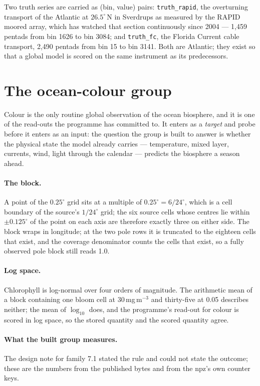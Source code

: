 \documentclass[10pt]{article}
\newcommand{\code}[1]{\texttt{#1}}
\begin{document}
Two truth series are carried as (bin, value) pairs: \code{truth\_rapid}, the
overturning transport of the Atlantic at $26.5^\circ$\,N in Sverdrups as
measured by the RAPID moored array, which has watched that section
continuously since 2004 --- 1,459 pentads from bin 1626 to bin 3084; and \code{truth\_fc}, the Florida
Current cable transport, 2,490 pentads from bin 15 to bin 3141. Both are
Atlantic; they exist so that a global model is scored on the same instrument
as its predecessors.

\section{The ocean-colour group}

Colour is the only routine global observation of the ocean biosphere, and it
is one of the read-outs the programme has committed to. It enters as a
\emph{target} and probe before it enters as an input: the question the group
is built to answer is whether the physical state the model already carries ---
temperature, mixed layer, currents, wind, light through the calendar ---
predicts the biosphere a season ahead.

\paragraph{The block.} A point of the $0.25^\circ$ grid sits at a multiple of
$0.25^\circ = 6/24^\circ$, which is a cell boundary of the source's
$1/24^\circ$ grid; the six source cells whose centres lie within
$\pm0.125^\circ$ of the point on each axis are therefore exactly three on
either side. The block wraps in longitude; at the two pole rows it is
truncated to the eighteen cells that exist, and the coverage denominator
counts the cells that exist, so a fully observed pole block still reads 1.0.

\paragraph{Log space.} Chlorophyll is log-normal over four orders of
magnitude. The arithmetic mean of a block containing one bloom cell at
30\,mg\,m$^{-3}$ and thirty-five at 0.05 describes neither; the mean of
$\log_{10}$ does, and the programme's read-out for colour is scored in log
space, so the stored quantity and the scored quantity agree.

\paragraph{What the built group measures.} The design note for family 7.1
stated the rule and could not state the outcome; these are the numbers from
the published bytes and from the npz's own counter keys.
\end{document}
